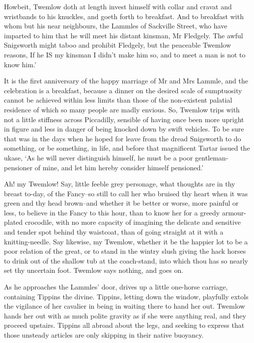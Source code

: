 Howbeit, Twemlow doth at length invest himself with collar and cravat
and wristbands to his knuckles, and goeth forth to breakfast. And to
breakfast with whom but his near neighbours, the Lammles of Sackville
Street, who have imparted to him that he will meet his distant kinsman,
Mr Fledgely. The awful Snigsworth might taboo and prohibit Fledgely, but
the peaceable Twemlow reasons, If he IS my kinsman I didn’t make him so,
and to meet a man is not to know him.’

It is the first anniversary of the happy marriage of Mr and Mrs Lammle,
and the celebration is a breakfast, because a dinner on the desired
scale of sumptuosity cannot be achieved within less limits than those
of the non-existent palatial residence of which so many people are
madly envious. So, Twemlow trips with not a little stiffness across
Piccadilly, sensible of having once been more upright in figure and less
in danger of being knocked down by swift vehicles. To be sure that was
in the days when he hoped for leave from the dread Snigsworth to do
something, or be something, in life, and before that magnificent Tartar
issued the ukase, ‘As he will never distinguish himself, he must be a
poor gentleman-pensioner of mine, and let him hereby consider himself
pensioned.’

Ah! my Twemlow! Say, little feeble grey personage, what thoughts are in
thy breast to-day, of the Fancy--so still to call her who bruised thy
heart when it was green and thy head brown--and whether it be better or
worse, more painful or less, to believe in the Fancy to this hour, than
to know her for a greedy armour-plated crocodile, with no more capacity
of imagining the delicate and sensitive and tender spot behind thy
waistcoat, than of going straight at it with a knitting-needle. Say
likewise, my Twemlow, whether it be the happier lot to be a poor
relation of the great, or to stand in the wintry slush giving the hack
horses to drink out of the shallow tub at the coach-stand, into which
thou has so nearly set thy uncertain foot. Twemlow says nothing, and
goes on.

As he approaches the Lammles’ door, drives up a little one-horse
carriage, containing Tippins the divine. Tippins, letting down the
window, playfully extols the vigilance of her cavalier in being in
waiting there to hand her out. Twemlow hands her out with as much polite
gravity as if she were anything real, and they proceed upstairs. Tippins
all abroad about the legs, and seeking to express that those unsteady
articles are only skipping in their native buoyancy.

